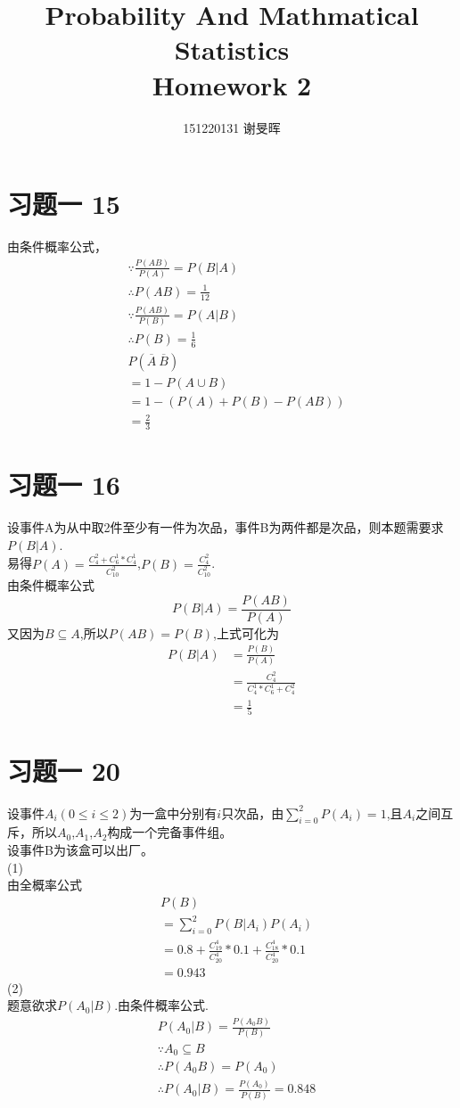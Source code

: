 \documentclass[a4paper,twocolumn]{ctexart}
\title{Probability And Mathmatical Statistics\\Homework 2}
\author{151220131 谢旻晖}
\date{}
\begin{document}
\maketitle
\section*{习题一 15}
\noindent
由条件概率公式，\\
\begin{align*}
&\because \frac{P(AB)}{P(A)}=P(B|A)\\
&\therefore P(AB)=\frac{1}{12}\\
&\because \frac{P(AB)}{P(B)}=P(A|B)\\
&\therefore P(B)=\frac{1}{6}\\
&P(\overline{A}\ \overline{B})\\
&=1-P(A\cup B)\\
&=1-(P(A)+P(B)-P(AB))\\
&=\frac{2}{3}
\end{align*}

\section*{习题一 16}
\noindent 设事件A为从中取2件至少有一件为次品，事件B为两件都是次品，则本题需要求$P(B|A)$.\\
\noindent 易得$P(A)=\frac{C_{4}^2+C_{6}^1*C_4^1}{C_{10}^{2}}$,$P(B)=\frac{C_{4}^2}{C_{10}^{2}}$.\\
\noindent 由条件概率公式
\[
P(B|A)=\frac{P(AB)}{P(A)}
\]
又因为$B\subseteq A$,所以$P(AB)=P(B)$,上式可化为
\begin{align*}
P(B|A)&=\frac{P(B)}{P(A)}\\
&=\frac{C_4^2}{C_4^1*C_6^1+C_4^2}\\
&=\frac{1}{5}
\end{align*}

\section*{习题一 20}
设事件$A_i (0\le i\le 2)$为一盒中分别有$i$只次品，由$\sum_{i=0}^{2}P(A_i)=1$,且$A_i$之间互斥，所以$A_0$,$A_1$,$A_2$构成一个完备事件组。\\
设事件B为该盒可以出厂。\\
(1)\\
由全概率公式
\begin{align*}
&P(B)\\
&=\sum_{i=0}^{2} P(B|A_i)P(A_i)\\
&=0.8+\frac{C_{19}^4}{C_{20}^4}*0.1+\frac{C_{18}^4}{C_{20}^4}*0.1\\
&=0.943
\end{align*}
(2)\\
题意欲求$P(A_0|B)$.由条件概率公式.\\
\begin{align*}
&P(A_0|B)=\frac{P(A_0B)}{P(B)}\\
&\because A_0 \subseteq B\\
&\therefore P(A_0B)=P(A_0)\\
&\therefore P(A_0|B)=\frac{P(A_0)}{P(B)}=0.848
\end{align*}
\end{document}
